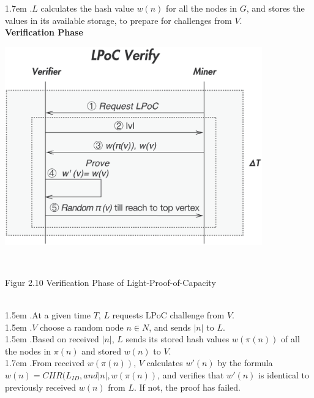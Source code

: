 \documentclass[10pt,a4paper]{article}
\begin{document}
\hangindent 1.7em
.\quad $L$ calculates the hash value $w(n)$ for all the nodes in $G$, and stores the values in its available storage, to prepare for challenges from $V$.
\vspace{-0.5em}
\\

\noindent   
 {\bf Verification Phase}\\
\centerline{\includegraphics[width=315pt]{fig10}}
 \\ \centerline{{Figur 2.10 Verification Phase of Light-Proof-of-Capacity}}
 \vspace{-1.5em}
\\

\hangindent 1.5em
.\quad At a given time $T$, $L$ requests LPoC challenge from $V$.
\vspace{-0.8em}
\\

\hangindent 1.5em
.\quad $V$ choose a random node $n \in N$, and sends $|n|$ to $L$.
\vspace{-0.8em}
\\

\hangindent 1.5em
.\quad Based on received $|n|$, $L$ sends its stored hash values $w(\pi(n))$ of all the nodes in $\pi(n)$ and stored $w(n)$ to $V$.
\vspace{-0.8em}
\\

\hangindent 1.7em
.\quad From received $w(\pi(n))$, $V$ calculates $w'(n)$ by the formula $w(n)=CHR(L_{ID}, and |n|, w(\pi(n))$, and verifies that $w'(n)$ is identical to previously received $w(n)$ from $L$. If not, the proof has failed.
\vspace{-0.8em}
\\
\end{document}
